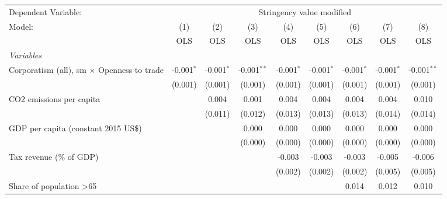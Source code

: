 
\begingroup
\centering
\begin{tabular}{lcccccccc}
   \toprule
   Dependent Variable: & \multicolumn{8}{c}{Stringency value modified}\\
   Model:                                            & (1)          & (2)          & (3)           & (4)          & (5)          & (6)          & (7)          & (8)\\  
                                                     &  OLS         & OLS          & OLS           & OLS          & OLS          & OLS          & OLS          & OLS\\  
   \midrule
   \emph{Variables}\\
   Corporatism (all), sm $\times$ Openness to trade  & -0.001$^{*}$ & -0.001$^{*}$ & -0.001$^{**}$ & -0.001$^{*}$ & -0.001$^{*}$ & -0.001$^{*}$ & -0.001$^{*}$ & -0.001$^{**}$\\   
                                                     & (0.001)      & (0.001)      & (0.001)       & (0.001)      & (0.001)      & (0.001)      & (0.001)      & (0.001)\\   
   CO2 emissions per capita                          &              & 0.004        & 0.001         & 0.004        & 0.004        & 0.004        & 0.004        & 0.010\\   
                                                     &              & (0.011)      & (0.012)       & (0.013)      & (0.013)      & (0.013)      & (0.014)      & (0.014)\\   
   GDP per capita (constant 2015 US\$)               &              &              & 0.000         & 0.000        & 0.000        & 0.000        & 0.000        & 0.000\\   
                                                     &              &              & (0.000)       & (0.000)      & (0.000)      & (0.000)      & (0.000)      & (0.000)\\   
   Tax revenue (\% of GDP)                           &              &              &               & -0.003       & -0.003       & -0.003       & -0.005       & -0.006\\   
                                                     &              &              &               & (0.002)      & (0.002)      & (0.002)      & (0.005)      & (0.005)\\   
   Share of population >65                           &              &              &               &              &              & 0.014        & 0.012        & 0.010\\   

\end{tabular}
